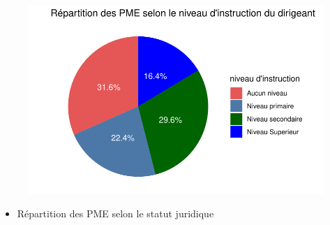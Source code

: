 \documentclass[
  letterpaper,
  DIV=11,
  numbers=noendperiod]{scrartcl}
\providecommand{\tightlist}{%
  \setlength{\itemsep}{0pt}\setlength{\parskip}{0pt}}\usepackage{longtable,booktabs,array}
\begin{document}
\begin{figure}[H]

{\centering \includegraphics{projet_R_files/figure-pdf/unnamed-chunk-21-1.pdf}

}

\end{figure}

\begin{itemize}
\tightlist
\item
  Répartition des PME selon le statut juridique
\end{itemize}
\end{document}
